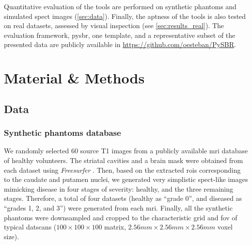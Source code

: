 \documentclass{frontiers}
\begin{document}
Quantitative evaluation of the tools are performed on synthetic
  phantoms and simulated \gls*{spect} images (\autoref{sec:data}).
Finally, the aptness of the tools is also tested on real datasets,
  assessed by visual inspection (see \autoref{sec:results_real}).
The evaluation framework, \gls*{pysbr}, one template,
  and a representative subset of the presented data are publicly 
  available in \url{https://github.com/oesteban/PySBR}.

\section{Material \& Methods} \label{sec:methods}

\subsection{Data}\label{sec:data}
 

\subsubsection{Synthetic phantoms database} %
\label{sec:data_synthetic}
We randomly selected 60 source T1 images from a publicly available
  \gls*{mri} database \citep{hill_ixi_2006} of healthy volunteers.
The striatal cavities and a brain mask were obtained from each dataset
  using \emph{Freesurfer} \citep{fischl_freesurfer_2012}.
Then, based on the extracted \glspl*{roi} corresponding to the caudate and putamen
  nuclei,  we generated very simplistic \gls*{spect}-like images mimicking disease in
  four stages of severity: healthy, and the three remaining stages.
  Therefore, a total of four datasets (healthy as ``grade 0'',
  and diseased as ``grades 1, 2, and 3'') were generated from each \gls*{mri}.
Finally, all the synthetic phantoms were downsampled and cropped to the characteristic
  grid and \acrlong*{fov} of typical \glspl*{datscan} ($100\times100\times100$ matrix,
  $2.56mm\times2.56mm\times2.56mm$ voxel size).
\end{document}
